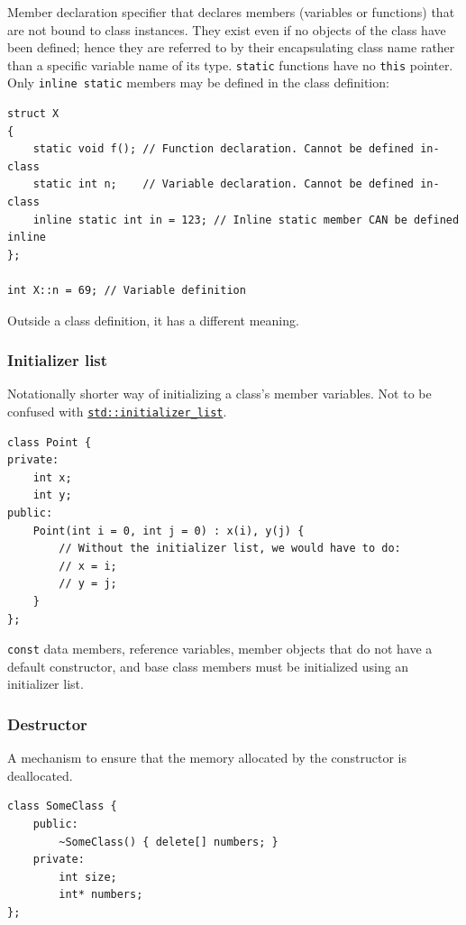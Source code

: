 \documentclass[table, xcdraw]{article}%
\begin{document}
Member declaration specifier that declares members (variables or functions) that are not bound to class instances. They exist even if no objects of the class have been defined; hence they are referred to by their encapsulating class name rather than a specific variable name of its type. \texttt{static} functions have no \texttt{this} pointer. Only \texttt{inline static} members may be defined in the class definition:

\begin{verbatim}
struct X
{
    static void f(); // Function declaration. Cannot be defined in-class
    static int n;    // Variable declaration. Cannot be defined in-class
    inline static int in = 123; // Inline static member CAN be defined inline
};

int X::n = 69; // Variable definition
\end{verbatim}

Outside a class definition, it has a different meaning.

\subsubsection{Initializer list} \label{initializerlist}
Notationally shorter way of initializing a class's member variables. Not to be confused with \hyperref[stdinitializerlist]{\texttt{std::initializer_list}}.

\begin{verbatim}
class Point { 
private: 
    int x; 
    int y; 
public: 
    Point(int i = 0, int j = 0) : x(i), y(j) {
        // Without the initializer list, we would have to do:
        // x = i;
        // y = j;
    } 
}; 
\end{verbatim}

\texttt{const} data members, reference variables, member objects that do not have a default constructor, and base class members must be initialized using an initializer list.

\subsubsection{Destructor}
A mechanism to ensure that the memory allocated by the constructor is deallocated.

\begin{verbatim}
class SomeClass {
    public:
        ~SomeClass() { delete[] numbers; }
    private:
        int size;
        int* numbers;
};
\end{verbatim}
\end{document}
